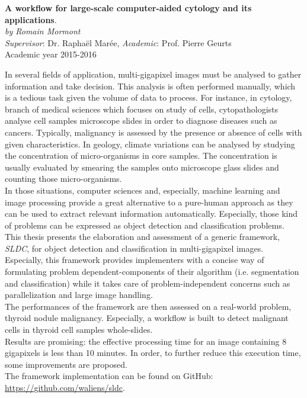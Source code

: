 \begin{center}
 
	{\sf \large \textbf{A workflow for large-scale computer-aided cytology and its applications}.}\\
\raggedleft
 	{\sf \textit{by Romain Mormont} }\\
\centering
	{\sf \textit{Supervisor}: Dr. Raphaël Marée, \textit{Academic}: Prof. Pierre Geurts }\\
\centering
	{\sf Academic year 2015-2016 }\

\end{center}
\hfill

In several fields of application, multi-gigapixel images must be analysed to gather information and take decision. This analysis is often performed manually, which is a tedious task given the volume of data to process. For instance, in cytology, branch of medical sciences which focuses on study of cells, cytopathologists analyse cell samples microscope slides in order to diagnose diseases such as cancers. Typically, malignancy is assessed by the presence or absence of cells with given characteristics. In geology, climate variations can be analysed by studying the concentration 
of micro-organisms in core samples. The concentration is usually evaluated by smearing the samples onto microscope glass slides and counting those micro-organisms. \\

In those situations, computer sciences and, especially, machine learning and image processing provide a great alternative to a pure-human approach as they can be used to extract relevant information automatically. Especially, those kind of problems can be expressed as object detection and classification problems.
\\

This thesis presents the elaboration and assessment of a generic framework, \textit{SLDC}, for object detection and classification in multi-gigapixel images. Especially, this framework provides implementers with a concise way of formulating problem dependent-components of their algorithm (i.e. segmentation and classification) while it takes care of problem-independent concerns such as parallelization and large image handling. 
\\

The performances of the framework are then assessed on a real-world problem, thyroid nodule malignancy. Especially, a workflow is built to detect malignant cells in thyroid cell samples whole-slides.
\\

Results are promising: the effective processing time for an image containing 8 gigapixels is less than 10 minutes. In order, to further reduce this execution time, some improvements are proposed.
\\

The framework implementation can be found on GitHub: \url{https://github.com/waliens/sldc}.

\hfill